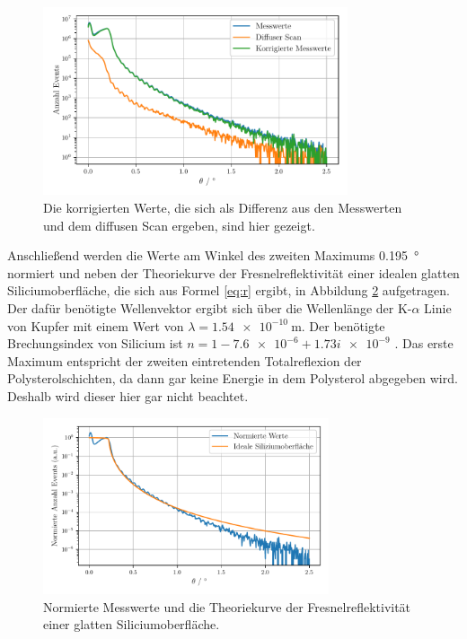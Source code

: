 \begin{figure}
    \centering
    \includegraphics[width=0.8\textwidth]{figures/messwerte_relativ.pdf}
    \caption{Die korrigierten Werte, die sich als Differenz aus den Messwerten und dem diffusen Scan ergeben, sind hier gezeigt.}
    \label{abb:diffus}
\end{figure}

Anschließend werden die Werte am Winkel des zweiten Maximums \SI{0.195}{\degree} normiert und neben der Theoriekurve der Fresnelreflektivität einer idealen glatten Siliciumoberfläche, die sich aus Formel \eqref{eq:r} ergibt, in Abbildung \ref{abb:norm} aufgetragen. Der dafür benötigte Wellenvektor ergibt sich über die Wellenlänge der K-$\alpha$ Linie von Kupfer mit einem Wert von $\lambda = \SI{1.54e-10}{\meter}$. 
Der benötigte Brechungsindex von Silicium ist $n = \num{1} - \num{7.6e-6} + \num{1.73i e-9}$ \cite{skript}.
Das erste Maximum entspricht der zweiten eintretenden Totalreflexion der Polysterolschichten, da dann gar keine Energie in dem Polysterol abgegeben wird. Deshalb wird dieser hier gar nicht beachtet.
\begin{figure}
    \centering
    \includegraphics[width=0.75\textwidth]{figures/messwerte_norm.pdf}
    \caption{Normierte Messwerte und die Theoriekurve der Fresnelreflektivität einer glatten Siliciumoberfläche.}
    \label{abb:norm}
\end{figure}

